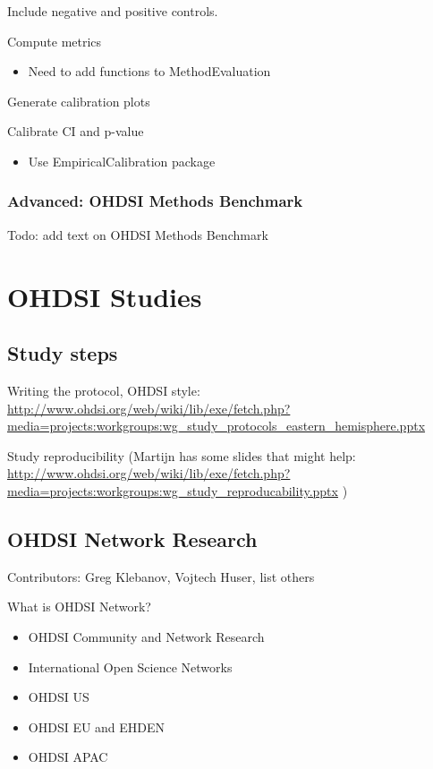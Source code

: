 \documentclass[]{book}
\providecommand{\tightlist}{%
  \setlength{\itemsep}{0pt}\setlength{\parskip}{0pt}}
\begin{document}
Include negative and positive controls.

Compute metrics

\begin{itemize}
\tightlist
\item
  Need to add functions to MethodEvaluation
\end{itemize}

Generate calibration plots

Calibrate CI and p-value

\begin{itemize}
\tightlist
\item
  Use EmpiricalCalibration package
\end{itemize}

\section{Advanced: OHDSI Methods
Benchmark}\label{advanced-ohdsi-methods-benchmark}

Todo: add text on OHDSI Methods Benchmark

\part{OHDSI Studies}\label{part-ohdsi-studies}

\chapter{Study steps}\label{StudySteps}

Writing the protocol, OHDSI style:
\url{http://www.ohdsi.org/web/wiki/lib/exe/fetch.php?media=projects:workgroups:wg_study_protocols_eastern_hemisphere.pptx}

Study reproducibility (Martijn has some slides that might help:
\url{http://www.ohdsi.org/web/wiki/lib/exe/fetch.php?media=projects:workgroups:wg_study_reproducability.pptx}
)

\chapter{OHDSI Network Research}\label{NetworkResearch}

Contributors: Greg Klebanov, Vojtech Huser, list others

What is OHDSI Network?

\begin{itemize}
\tightlist
\item
  OHDSI Community and Network Research
\item
  International Open Science Networks
\item
  OHDSI US
\item
  OHDSI EU and EHDEN
\item
  OHDSI APAC
\end{itemize}
\end{document}

